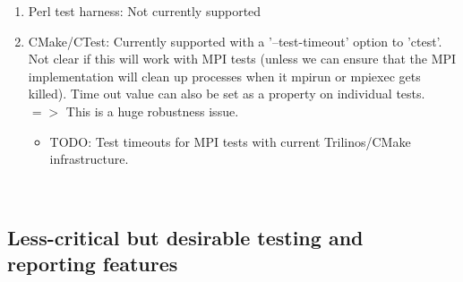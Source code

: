 \documentclass[pdf,ps2pdf,11pt]{SANDreport}
\begin{document}
\begin{enumerate}
\begin{enumerate}
  {}\item Perl test harness: Not currently supported

  {}\item CMake/CTest: Currently supported with a '--test-timeout'
  option to 'ctest'.  Not clear if this will work with MPI tests
  (unless we can ensure that the MPI implementation will clean up
  processes when it mpirun or mpiexec gets killed).  Time out value
  can also be set as a property on individual tests. $=>$ This is a
  huge robustness issue.

    \begin{itemize}
   
    {}\item TODO: Test timeouts for MPI tests with current
    Trilinos/CMake infrastructure.

    \end{itemize}

  \end{enumerate}

\end{enumerate}

\
%
{}\subsection{Less-critical but desirable testing and reporting features}
%
\end{document}
